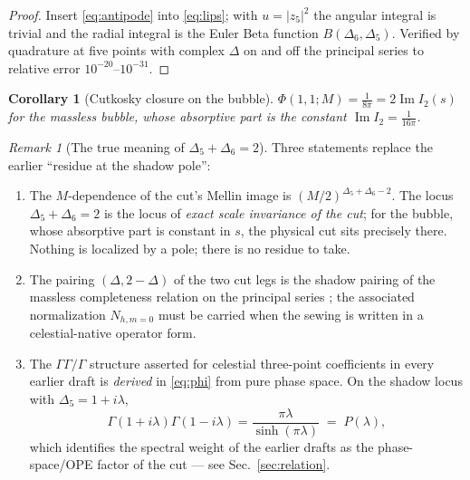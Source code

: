 \documentclass[12pt,a4paper]{article}
\theoremstyle{plain}
\newtheorem{corollary}[theorem]{Corollary}
\theoremstyle{definition}
\theoremstyle{remark}
\newtheorem{remark}[theorem]{Remark}
\begin{document}
\begin{proof}
Insert \eqref{eq:antipode} into \eqref{eq:lips}; with $u=|z_5|^2$ the
angular integral is trivial and the radial integral is the Euler Beta
function $B(\Delta_6,\Delta_5)$.  Verified by quadrature at five points
with complex $\Delta$ on and off the principal series to relative error
$10^{-20}$--$10^{-31}$.
\end{proof}

\begin{corollary}[Cutkosky closure on the bubble]
\label{cor:bubble}
$\Phi(1,1;M)=\tfrac{1}{8\pi}=2\operatorname{Im}I_2(s)$ for the massless
bubble, whose absorptive part is the constant
$\operatorname{Im}I_2=\tfrac{1}{16\pi}$.
\end{corollary}

\begin{remark}[The true meaning of $\Delta_5+\Delta_6=2$]
\label{rem:shadowlocus}
Three statements replace the earlier ``residue at the shadow pole'':
\begin{enumerate}
\item The $M$-dependence of the cut's Mellin image is
$(M/2)^{\Delta_5+\Delta_6-2}$.  The locus $\Delta_5+\Delta_6=2$ is the
locus of \emph{exact scale invariance of the cut}; for the bubble,
whose absorptive part is constant in $s$, the physical cut sits
precisely there.  Nothing is localized by a pole; there is no residue
to take.
\item The pairing $(\Delta,2-\Delta)$ of the two cut legs is the shadow
pairing of the massless completeness relation on the principal series
\cite{LamShao2018,CelestialOptical2024}; the associated normalization
$N_{h,m=0}$ must be carried when the sewing is written in a
celestial-native operator form.
\item The $\Gamma\Gamma/\Gamma$ structure asserted for celestial
three-point coefficients in every earlier draft is \emph{derived} in
\eqref{eq:phi} from pure phase space.  On the shadow locus with
$\Delta_5=1+i\lambda$,
\begin{equation}
\Gamma(1+i\lambda)\Gamma(1-i\lambda)
=\frac{\pi\lambda}{\sinh(\pi\lambda)}\;=\;P(\lambda),
\label{eq:plambda}
\end{equation}
which identifies the spectral weight of the earlier drafts as the
phase-space/OPE factor of the cut --- see
Sec.~\ref{sec:relation}.
\end{enumerate}
\end{remark}

\end{document}

